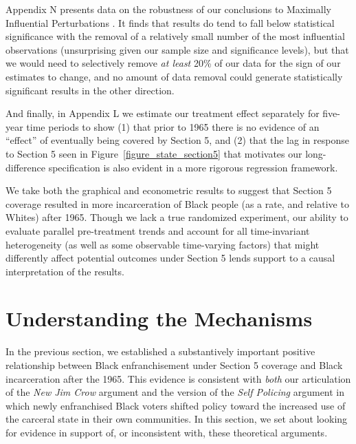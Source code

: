 \documentclass[12pt]{article}
\begin{document}
Appendix N presents data on the robustness of our conclusions to Maximally Influential Perturbations \citep{broderick2021}. It finds that results do tend to fall below statistical significance with the removal of a relatively small number of the most influential observations (unsurprising given our sample size and significance levels), but that we would need to selectively remove \emph{at least} 20\% of our data for the sign of our estimates to change, and no amount of data removal could generate statistically significant results in the other direction.

And finally, in Appendix L we estimate our treatment effect separately for five-year time periods to show (1) that prior to 1965 there is no evidence of an ``effect'' of eventually being covered by Section 5, and (2) that the lag in response to Section 5 seen in Figure~\ref{figure_state_section5} that motivates our long-difference specification is also evident in a more rigorous regression framework.

We take both the graphical and econometric results to suggest that Section 5 coverage resulted in more incarceration of Black people (as a rate, and relative to Whites) after 1965.  Though we lack a true randomized experiment, our ability to evaluate parallel pre-treatment trends and account for all time-invariant heterogeneity (as well as some observable time-varying factors) that might differently affect potential outcomes under Section 5 lends support to a causal interpretation of the results.



\section*{Understanding the Mechanisms}\label{section_selfpolicing}

In the previous section, we established a substantively important positive relationship between Black enfranchisement under Section 5 coverage and Black incarceration after the 1965.  This evidence is consistent with \emph{both} our articulation of the \emph{New Jim Crow} argument and the version of the \emph{Self Policing} argument in which newly enfranchised Black voters shifted policy toward the increased use of the carceral state in their own communities.  In this section, we set about looking for evidence in support of, or inconsistent with, these theoretical arguments.
\end{document}
